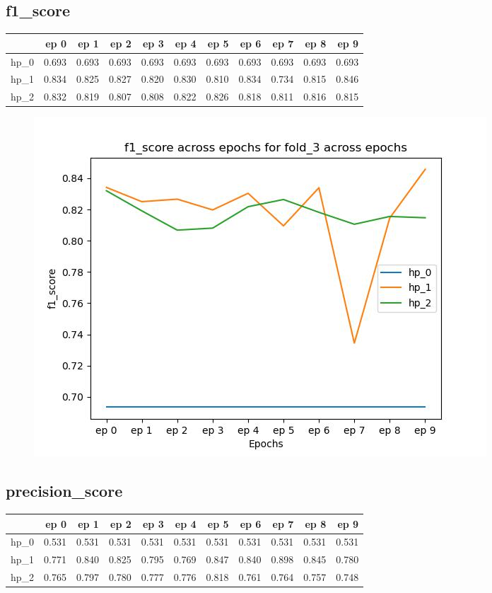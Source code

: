 \documentclass{article}
\begin{document}
\subsection{f1\_score}
\begin{tabular}{lrrrrrrrrrr}
\toprule
{} &   ep 0 &   ep 1 &   ep 2 &   ep 3 &   ep 4 &   ep 5 &   ep 6 &   ep 7 &   ep 8 &   ep 9 \\
\midrule
hp\_0 &  0.693 &  0.693 &  0.693 &  0.693 &  0.693 &  0.693 &  0.693 &  0.693 &  0.693 &  0.693 \\
hp\_1 &  0.834 &  0.825 &  0.827 &  0.820 &  0.830 &  0.810 &  0.834 &  0.734 &  0.815 &  0.846 \\
hp\_2 &  0.832 &  0.819 &  0.807 &  0.808 &  0.822 &  0.826 &  0.818 &  0.811 &  0.816 &  0.815 \\
\bottomrule
\end{tabular}

\begin{figure}[H]
\includegraphics[scale = 0.75]{fold_3/f1_score}
\end{figure}
\subsection{precision\_score}
\begin{tabular}{lrrrrrrrrrr}
\toprule
{} &   ep 0 &   ep 1 &   ep 2 &   ep 3 &   ep 4 &   ep 5 &   ep 6 &   ep 7 &   ep 8 &   ep 9 \\
\midrule
hp\_0 &  0.531 &  0.531 &  0.531 &  0.531 &  0.531 &  0.531 &  0.531 &  0.531 &  0.531 &  0.531 \\
hp\_1 &  0.771 &  0.840 &  0.825 &  0.795 &  0.769 &  0.847 &  0.840 &  0.898 &  0.845 &  0.780 \\
hp\_2 &  0.765 &  0.797 &  0.780 &  0.777 &  0.776 &  0.818 &  0.761 &  0.764 &  0.757 &  0.748 \\
\bottomrule
\end{tabular}
\end{document}
